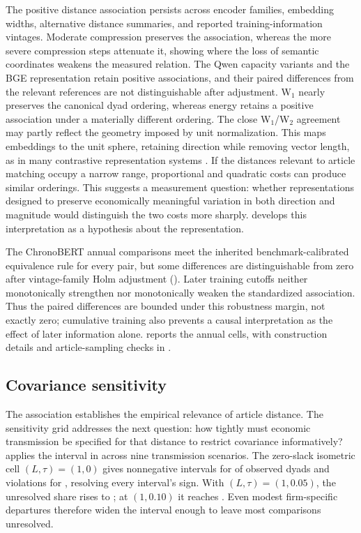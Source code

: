 The positive distance association persists across encoder families,
embedding widths, alternative distance summaries, and reported
training-information vintages.
Moderate compression preserves the association, whereas the more severe
compression steps attenuate it, showing where the loss of semantic
coordinates weakens the measured relation.
The Qwen capacity variants and the BGE representation retain positive
associations, and their paired differences from the relevant references are
not distinguishable after adjustment.
W$_1$ nearly preserves the canonical dyad ordering, whereas energy retains a
positive association under a materially different ordering.
The close W$_1$/W$_2$ agreement may partly reflect the geometry imposed by
unit normalization.
This maps embeddings to the unit sphere, retaining direction while removing
vector length, as in many contrastive representation systems
\citep{wang_isola_hypersphere_2020}.
If the distances relevant to article matching occupy a narrow range,
proportional and quadratic costs can produce similar orderings.
This suggests a measurement question: whether representations designed to
preserve economically meaningful variation in both direction and magnitude
would distinguish the two costs more sharply.
 develops this interpretation as a
hypothesis about the representation.

The ChronoBERT annual comparisons meet the inherited benchmark-calibrated
equivalence rule for every pair, but some differences are distinguishable
from zero after vintage-family Holm adjustment
().
Later training cutoffs neither monotonically strengthen nor monotonically
weaken the standardized association.
Thus the paired differences are bounded under this robustness margin,
not exactly zero; cumulative training also prevents a causal interpretation
as the effect of later information alone.
 reports the annual cells, with
construction details and article-sampling checks in
.

\subsection{Covariance sensitivity}\label{sec:fixed-w2-test}

The association establishes the empirical relevance of article distance.
The sensitivity grid addresses the next question: how tightly must economic
transmission be specified for that distance to restrict covariance informatively?
 applies the interval in
 across nine transmission scenarios.
The zero-slack isometric cell $(L,\tau)=(1,0)$ gives nonnegative intervals for
 of observed dyads and violations for
, resolving every interval's sign.
With $(L,\tau)=(1,0.05)$, the unresolved share rises to
; at $(1,0.10)$ it reaches
.
Even modest firm-specific departures therefore widen the interval enough to
leave most comparisons unresolved.

